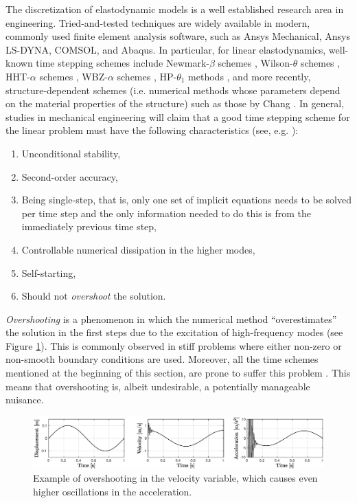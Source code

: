 \documentclass{sfuthesis}
\numberwithin{equation}{section}
\numberwithin{figure}{chapter}
\numberwithin{table}{chapter}
\theoremstyle{definition}
\begin{document}
The discretization of elastodynamic models is a well established research area in engineering. Tried-and-tested techniques are widely available in modern, commonly used finite element analysis software, such as Ansys Mechanical, Ansys LS-DYNA, COMSOL, and Abaqus. In particular, for linear elastodynamics, well-known time stepping schemes include Newmark-$\beta$ schemes \cite{Newmark}, Wilson-$\theta$ schemes \cite{Wilson}, HHT-$\alpha$ schemes \cite{HHTalpha}, WBZ-$\alpha$ schemes \cite{WBZ}, HP-$\theta_1$ methods \cite{HPtheta}, and more recently, structure-dependent schemes (i.e. numerical methods whose parameters depend on the material properties of the structure) such as those by Chang \cite{ChangSD}. In general, studies in mechanical engineering will claim that a good time stepping scheme for the linear problem must have the following characteristics (see, e.g. \cite{HughesBook, KadapaDettmerPeric2017, RossiEtAl2014}):
\begin{enumerate}
    \item Unconditional stability,
    \item Second-order accuracy,
    \item Being single-step, that is, only one set of implicit equations needs to be solved per time step and the only information needed to do this is from the immediately previous time step,
    \item Controllable numerical dissipation in the higher modes,
    \item Self-starting,
    \item Should not \textit{overshoot} the solution.
\end{enumerate}

\textit{Overshooting} is a phenomenon in which the numerical method ``overestimates'' the solution in the first steps due to the excitation of high-frequency modes (see Figure \ref{fig:overshoot}). This is commonly observed in stiff problems where either non-zero or non-smooth boundary conditions are used. Moreover, all the time schemes mentioned at the beginning of this section, are prone to suffer this problem \cite{MaxamTamma2022}. This means that overshooting is, albeit undesirable, a potentially manageable nuisance. %


\begin{figure}
    \centering
    \hspace*{-4em}\includegraphics[width=1.19\textwidth]{figs/overshooting.eps}
    \caption{Example of overshooting in the velocity variable, which causes even higher oscillations in the acceleration.}
    \label{fig:overshoot}
\end{figure}
\end{document}
